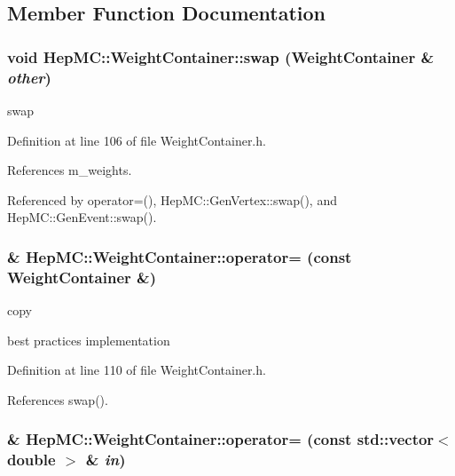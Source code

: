\subsection{Member Function Documentation}
\subsubsection{\setlength{\rightskip}{0pt plus 5cm}void Hep\-MC::Weight\-Container::swap ({\bf Weight\-Container} \& {\em other})\hspace{0.3cm}{\tt  [inline]}}\label{classHepMC_1_1WeightContainer_b84491cd61e30b13f33dacc9c4ea6b0e}


swap 



Definition at line 106 of file Weight\-Container.h.

References m\_\-weights.

Referenced by operator=(), Hep\-MC::Gen\-Vertex::swap(), and Hep\-MC::Gen\-Event::swap().
\subsubsection{ \& Hep\-MC::Weight\-Container::operator= (const {\bf Weight\-Container} \&)\hspace{0.3cm}{\tt  [inline]}}\label{classHepMC_1_1WeightContainer_63969243852a53473a2a4772030a2b58}


copy 



best practices implementation 

Definition at line 110 of file Weight\-Container.h.

References swap().
\subsubsection{ \& Hep\-MC::Weight\-Container::operator= (const std::vector$<$ double $>$ \& {\em in})\hspace{0.3cm}{\tt  [inline]}}\label{classHepMC_1_1WeightContainer_8517621049622bc0d1b0e37f38bd313c}


